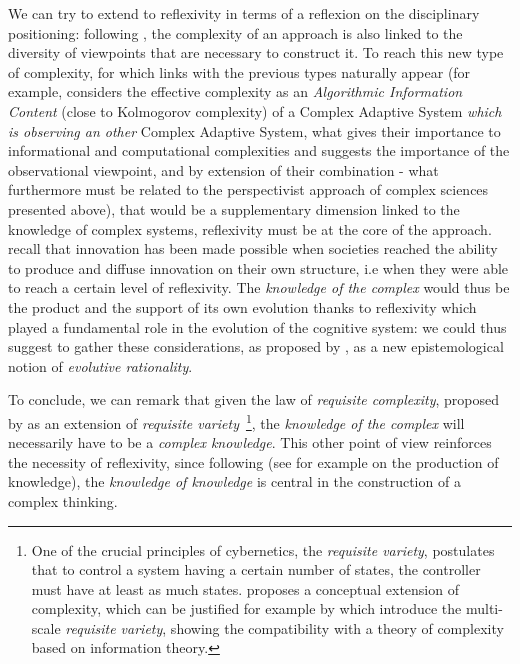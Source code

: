 We can try to extend to reflexivity in terms of a reflexion on the disciplinary positioning: following \cite{pumain2005cumulativite}, the complexity of an approach is also linked to the diversity of viewpoints that are necessary to construct it. To reach this new type of complexity, for which links with the previous types naturally appear (for example, \cite{gell1995quark} considers the effective complexity as an \emph{Algorithmic Information Content} (close to Kolmogorov complexity) of a Complex Adaptive System \emph{which is observing an other} Complex Adaptive System, what gives their importance to informational and computational complexities and suggests the importance of the observational viewpoint, and by extension of their combination - what furthermore must be related to the perspectivist approach of complex sciences presented above), that would be a supplementary dimension linked to the knowledge of complex systems, reflexivity must be at the core of the approach. \cite{read2009innovation} recall that innovation has been made possible when societies reached the ability to produce and diffuse innovation on their own structure, i.e when they were able to reach a certain level of reflexivity. The \emph{knowledge of the complex} would thus be the product and the support of its own evolution thanks to reflexivity which played a fundamental role in the evolution of the cognitive system: we could thus suggest to gather these considerations, as proposed by , as a new epistemological notion of \emph{evolutive rationality}.



To conclude, we can remark that given the law of \emph{requisite complexity}, proposed by \cite{gershenson2015requisite} as an extension of \emph{requisite variety}~\cite{ashby1991requisite}\footnote{One of the crucial principles of cybernetics, the \emph{requisite variety}, postulates that to control a system having a certain number of states, the controller must have at least as much states.  proposes a conceptual extension of complexity, which can be justified for example by \cite{allen2017multiscale} which introduce the multi-scale \emph{requisite variety}, showing the compatibility with a theory of complexity based on information theory.}, the \emph{knowledge of the complex} will necessarily have to be a \emph{complex knowledge}. This other point of view reinforces the necessity of reflexivity, since following  (see for example \cite{morin1991methode} on the production of knowledge), the \emph{knowledge of knowledge} is central in the construction of a complex thinking.



